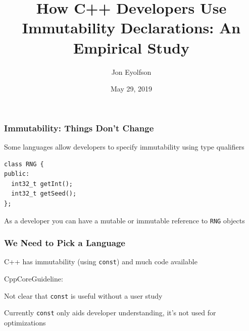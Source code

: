 \documentclass[aspectratio=169]{beamer}
\title{How C++ Developers Use Immutability Declarations: An Empirical Study}
\date{May 29, 2019}
\author{Jon Eyolfson}
\begin{document}
  \begin{frame}[plain]
    \titlepage
  \end{frame}

  \setcounter{framenumber}{0}

  \begin{frame}[fragile]
    \frametitle{Immutability: Things Don't Change}

    Some languages allow developers to specify immutability using type
    qualifiers
    \begin{lstlisting}[xleftmargin=1cm]
class RNG {
public:
  int32_t getInt();
  int32_t getSeed();
};
    \end{lstlisting}

    As a developer you can have a mutable or immutable reference to \texttt{RNG}
    objects

    \vspace{4em}

  \end{frame}

  \begin{frame}
    \frametitle{We Need to Pick a Language}

    C++ has immutability (using \texttt{const}) and much code available

    \vspace{1em}

    \hspace{1em} CppCoreGuideline: 

    \vspace{4em}

    Not clear that \texttt{const} is useful without a user study

    \vspace{1em}

    \hspace{1em} Currently \texttt{const} only aids developer understanding,
    it's not used for optimizations
  \end{frame}
\end{document}
